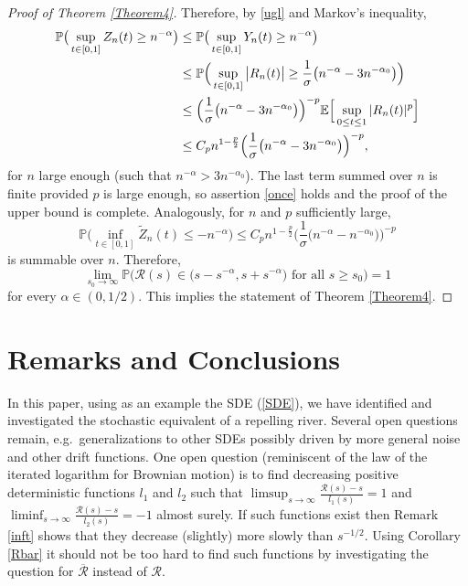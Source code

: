 \documentclass[sn-mathphys-num]{sn-jnl}
\theoremstyle{definition}
\newcommand{\scr}[1]{\mathscr #1}
\numberwithin{equation}{section} \theoremstyle{remark}
\def\RR{\mathscr R}
\def\P{\mathbb P}
\newcommand{\1}{\mathbbm{1}}
\renewcommand{\tilde}{\widetilde}
\begin{document}
\begin{proof}[Proof of Theorem \ref{Theorem4}]
Therefore, by \eqref{ugl} and Markov's inequality,
\begin{align*}
\P\big(\sup_{t \in [0,1]} Z_n(t)\geq n^{-\alpha}\big) &\leq \P\big(\sup_{t \in [0,1]} Y_n(t)\geq n^{-\alpha}\big)\\
                                                   &\leq   \P\Big(\sup_{t \in [0,1]} \big|R_n(t)\big|\geq \frac 1\sigma \big(n^{-\alpha}-3n^{-\alpha_0}\big)\Big)\\
                                                   &\leq \Big(\frac 1\sigma \big(n^{-\alpha}-3n^{-\alpha_0}\big)\Big)^{-p}\E\Big[\sup_{0\leq t \leq 1}|R_n(t)|^p\Big]\\
&\leq   C_p  n^{1-\frac p2} \Big(\frac 1\sigma \big(n^{-\alpha}-3n^{-\alpha_0}\big)\Big)^{-p},
\end{align*}
for  $n$ large enough (such that $n^{-\alpha}>3n^{-\alpha_0}$). The last term summed over $n$ is finite provided $p$ is large enough, so 
assertion \eqref{once} holds and the proof of the upper bound is complete. Analogously, for $n$ and $p$ sufficiently large,
$$
\P\big(\inf_{t \in [0,1]} \tilde Z_n(t)\leq -n^{-\alpha}\big) \leq  C_p  n^{1-\frac p2} \Big(\frac 1\sigma \big(n^{-\alpha}-n^{-\alpha_0}\big)\Big)^{-p}
$$
is summable over $n$. Therefore,
$$
\lim_{s_0 \to \infty}\P\Big( \RR(s) \in \big(s-s^{-\alpha},s+ s^{-\alpha}\big) \mbox{ for all } s \geq s_0\Big)=1
$$
for every $\alpha \in (0,1/2)$. This implies the statement of Theorem \ref{Theorem4}.
\end{proof}


  
  \section{Remarks and Conclusions} \label{conc}
In this paper, using as an example the SDE (\ref{SDE}), we have identified
and investigated the stochastic equivalent of a repelling river. Several
open questions remain, e.g.~generalizations to other SDEs possibly driven by more general noise and other drift functions.  One open question (reminiscent of the law of the iterated logarithm for Brownian motion) is to find  decreasing positive deterministic functions $l_1$ and $l_2$ such that
$\limsup_{s \to \infty}\frac{\RR(s)-s}{l_1(s)}=1$ and  $\liminf_{s \to \infty}\frac{\RR(s)-s}{l_2(s)}=-1$ almost surely. If such functions exist then Remark \ref{inft} shows that they decrease (slightly) more slowly than
$s^{-1/2}$. Using Corollary \ref{Rbar} it should not be too hard to find such functions by investigating the question for $\overline{\scr{R}}$ instead of $\scr{R}$. 
\end{document}
